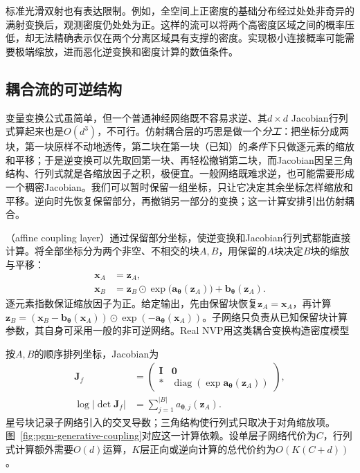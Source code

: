 标准光滑双射也有表达限制。例如，全空间上正密度的基础分布经过处处非奇异的满射变换后，观测密度仍处处为正。这样的流可以将两个高密度区域之间的概率压低，却无法精确表示仅在两个分离区域具有支撑的密度。实现极小连接概率可能需要极端缩放，进而恶化逆变换和密度计算的数值条件。

\subsection{耦合流的可逆结构}
\label{sec:pgm-generative-flow-expression}

变量变换公式虽简单，但一个普通神经网络既不容易求逆、其$d\times d$ Jacobian行列式算起来也是$O(d^3)$，不可行。仿射耦合层的巧思是做一个\emph{分工}：把坐标分成两块，第一块原样不动地透传，第二块在第一块（已知）的\emph{条件}下只做逐元素的缩放和平移；于是逆变换可以先取回第一块、再轻松撤销第二块，而Jacobian因呈三角结构、行列式就是各缩放因子之积，极便宜。一般网络既难求逆，也可能需要形成一个稠密Jacobian。我们可以暂时保留一组坐标，只让它决定其余坐标怎样缩放和平移。逆向时先恢复保留部分，再撤销另一部分的变换；这一计算安排引出仿射耦合。

\label{sec:pgm-generative-invertible-networks}

（affine coupling layer）通过保留部分坐标，使逆变换和Jacobian行列式都能直接计算。将全部坐标分为两个非空、不相交的块$A,B$，用保留的$A$块决定$B$块的缩放与平移：
\begin{equation}
  \label{eq:pgm-generative-coupling}
  \begin{aligned}
    \bm{x}_A&=\bm{z}_A,\\
    \bm{x}_B&=\bm{z}_B\odot
       \exp\bigl(\bm{a}_{\bm{\theta}}(\bm{z}_A)\bigr)
          +\bm{b}_{\bm{\theta}}(\bm{z}_A).
  \end{aligned}
\end{equation}
逐元素指数保证缩放因子为正。给定输出，先由保留块恢复$\bm{z}_A=\bm{x}_A$，再计算$\bm{z}_B=(\bm{x}_B-\bm{b}_{\bm{\theta}}(\bm{x}_A))\odot\exp(-\bm{a}_{\bm{\theta}}(\bm{x}_A))$。子网络只负责从已知保留块计算参数，其自身可采用一般的非可逆网络。Real NVP用这类耦合变换构造密度模型

按$A,B$的顺序排列坐标，Jacobian为
\begin{equation}
  \label{eq:pgm-generative-coupling-jacobian}
  \begin{aligned}
    \bm{J}_{f}
      &=
        \begin{pmatrix}
          \bm{I}&\bm{0}\\
          *&\operatorname{diag}(\exp\bm{a}_{\bm{\theta}}(\bm{z}_A))
        \end{pmatrix},\\
    \log|\det\bm{J}_{f}|
      &=\sum_{j=1}^{|B|}a_{\bm{\theta},j}(\bm{z}_A).
  \end{aligned}
\end{equation}
星号块记录子网络引入的交叉导数；三角结构使行列式只取决于对角缩放项。图~\ref{fig:pgm-generative-coupling}对应这一计算依赖。设单层子网络代价为$C$，行列式计算额外需要$O(d)$运算，$K$层正向或逆向计算的总代价约为$O(K(C+d))$。


